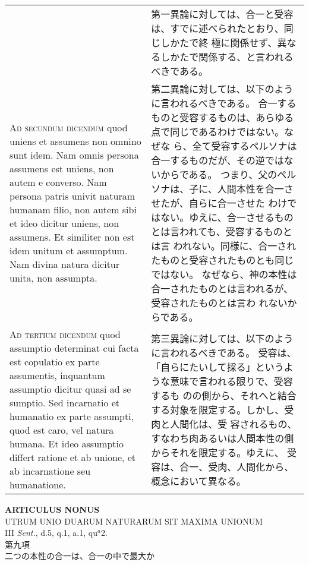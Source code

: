\documentclass[10pt]{jsarticle} %
\begin{document}
\begin{longtable}{p{21em}p{21em}}
&

第一異論に対しては、合一と受容は、すでに述べられたとおり、同じしかたで終
 極に関係せず、異なるしかたで関係する、と言われるべきである。


\\



{\scshape Ad secundum dicendum} quod uniens et assumens non omnino sunt idem. Nam
omnis persona assumens est uniens, non autem e converso. Nam persona
patris univit naturam humanam filio, non autem sibi et ideo dicitur
uniens, non assumens. Et similiter non est idem unitum et assumptum. Nam
divina natura dicitur unita, non assumpta.


&

第二異論に対しては、以下のように言われるべきである。
合一するものと受容するものは、あらゆる点で同じであるわけではない。なぜな
 ら、全て受容するペルソナは合一するものだが、その逆ではないからである。
 つまり、父のペルソナは、子に、人間本性を合一させたが、自らに合一させた
 わけではない。ゆえに、合一させるものとは言われても、受容するものとは言
 われない。同様に、合一されたものと受容されたものとも同じではない。
なぜなら、神の本性は合一されたものとは言われるが、受容されたものとは言わ
 れないからである。


\\



{\scshape Ad tertium dicendum} quod assumptio determinat cui facta est copulatio ex
parte assumentis, inquantum assumptio dicitur quasi ad se sumptio. Sed
incarnatio et humanatio ex parte assumpti, quod est caro, vel natura
humana. Et ideo assumptio differt ratione et ab unione, et ab
incarnatione seu humanatione.


&


第三異論に対しては、以下のように言われるべきである。
受容は、「自らにたいして採る」というような意味で言われる限りで、受容するも
 のの側から、それへと結合する対象を限定する。しかし、受肉と人間化は、受
 容されるもの、すなわち肉あるいは人間本性の側からそれを限定する。ゆえに、
 受容は、合一、受肉、人間化から、概念において異なる。

\\



\end{longtable}
\newpage



\begin{center}
 {\Large {\bf ARTICULUS NONUS}}\\
 {\large UTRUM UNIO DUARUM NATURARUM SIT MAXIMA UNIONUM}\\
 {\footnotesize III {\itshape Sent.}, d.5, q.1, a.1, qu$^a$2.}\\
 {\Large 第九項\\二つの本性の合一は、合一の中で最大か}
\end{center}
\end{document}
